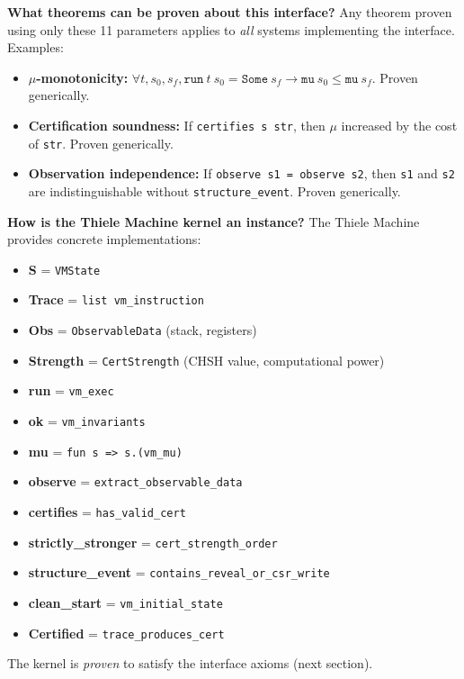 \textbf{What theorems can be proven about this interface?} Any theorem proven using only these 11 parameters applies to \textit{all} systems implementing the interface. Examples:
\begin{itemize}
    \item \textbf{$\mu$-monotonicity:} $\forall t, s_0, s_f, \texttt{run}\ t\ s_0 = \texttt{Some}\ s_f \to \texttt{mu}\ s_0 \leq \texttt{mu}\ s_f$. Proven generically.
    \item \textbf{Certification soundness:} If \texttt{certifies s str}, then $\mu$ increased by the cost of \texttt{str}. Proven generically.
    \item \textbf{Observation independence:} If \texttt{observe s1 = observe s2}, then \texttt{s1} and \texttt{s2} are indistinguishable without \texttt{structure\_event}. Proven generically.
\end{itemize}

\textbf{How is the Thiele Machine kernel an instance?} The Thiele Machine provides concrete implementations:
\begin{itemize}
    \item \textbf{S} = \texttt{VMState}
    \item \textbf{Trace} = \texttt{list vm\_instruction}
    \item \textbf{Obs} = \texttt{ObservableData} (stack, registers)
    \item \textbf{Strength} = \texttt{CertStrength} (CHSH value, computational power)
    \item \textbf{run} = \texttt{vm\_exec}
    \item \textbf{ok} = \texttt{vm\_invariants}
    \item \textbf{mu} = \texttt{fun s => s.(vm\_mu)}
    \item \textbf{observe} = \texttt{extract\_observable\_data}
    \item \textbf{certifies} = \texttt{has\_valid\_cert}
    \item \textbf{strictly\_stronger} = \texttt{cert\_strength\_order}
    \item \textbf{structure\_event} = \texttt{contains\_reveal\_or\_csr\_write}
    \item \textbf{clean\_start} = \texttt{vm\_initial\_state}
    \item \textbf{Certified} = \texttt{trace\_produces\_cert}
\end{itemize}
The kernel is \textit{proven} to satisfy the interface axioms (next section).

